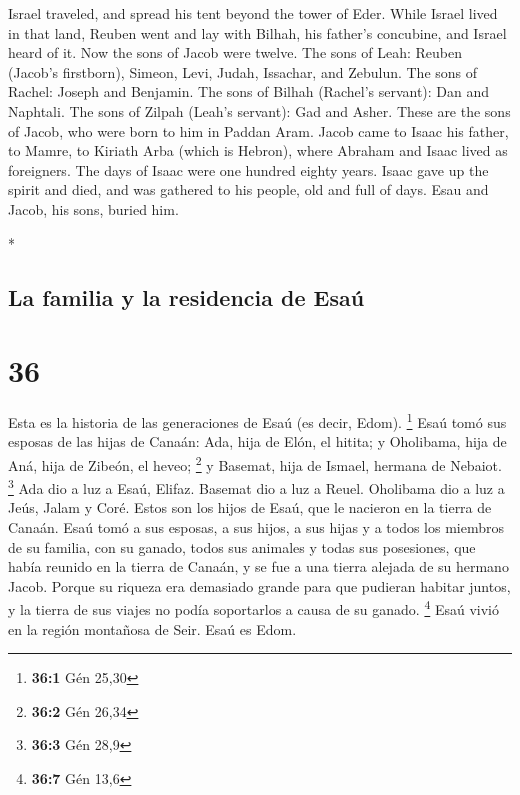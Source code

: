 \begin{paracol}{2}
\begin{otherlanguage}{english}
 Israel traveled, and spread his tent beyond the tower of
Eder.  While Israel lived in that land, Reuben went and
lay with Bilhah, his father's concubine, and Israel heard of it. Now the
sons of Jacob were twelve.  The sons of Leah: Reuben
(Jacob's firstborn), Simeon, Levi, Judah, Issachar, and Zebulun.
 The sons of Rachel: Joseph and Benjamin. 
The sons of Bilhah (Rachel's servant): Dan and Naphtali. 
The sons of Zilpah (Leah's servant): Gad and Asher. These are the sons
of Jacob, who were born to him in Paddan Aram.  Jacob
came to Isaac his father, to Mamre, to Kiriath Arba (which is Hebron),
where Abraham and Isaac lived as foreigners.  The days of
Isaac were one hundred eighty years.  Isaac gave up the
spirit and died, and was gathered to his people, old and full of days.
Esau and Jacob, his sons, buried him.

\end{otherlanguage}

\switchcolumn[0]*

\hypertarget{la-familia-y-la-residencia-de-esauxfa}{%
\subsection{La familia y la residencia de
Esaú}\label{la-familia-y-la-residencia-de-esauxfa}}

\hypertarget{section-70}{%
\section{36}\label{section-70}}

 Esta es la historia de las generaciones de Esaú (es
decir, Edom). \footnote{\textbf{36:1} Gén 25,30}  Esaú
tomó sus esposas de las hijas de Canaán: Ada, hija de Elón, el hitita; y
Oholibama, hija de Aná, hija de Zibeón, el heveo; \footnote{\textbf{36:2}
  Gén 26,34}  y Basemat, hija de Ismael, hermana de
Nebaiot. \footnote{\textbf{36:3} Gén 28,9}  Ada dio a luz
a Esaú, Elifaz. Basemat dio a luz a Reuel.  Oholibama dio
a luz a Jeús, Jalam y Coré. Estos son los hijos de Esaú, que le nacieron
en la tierra de Canaán.  Esaú tomó a sus esposas, a sus
hijos, a sus hijas y a todos los miembros de su familia, con su ganado,
todos sus animales y todas sus posesiones, que había reunido en la
tierra de Canaán, y se fue a una tierra alejada de su hermano Jacob.
 Porque su riqueza era demasiado grande para que pudieran
habitar juntos, y la tierra de sus viajes no podía soportarlos a causa
de su ganado. \footnote{\textbf{36:7} Gén 13,6}  Esaú
vivió en la región montañosa de Seir. Esaú es Edom.


\end{paracol}
